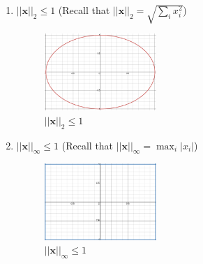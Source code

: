 \documentclass[a4paper]{article}
\theoremstyle{definition}
\newenvironment{soln}{
	\leavevmode\color{blue}\ignorespaces
}{}
\begin{document}
\begin{enumerate}
		\item 	$||\mathbf{x}||_2 \leq 1$ (Recall that $||\mathbf{x}||_2 =\sqrt{\sum_i x_i^2}$)
			\begin{soln}
			\begin{figure}[h!]
			    \centering
			    \includegraphics[width=0.4\textwidth]{images/l2.png}  
			    \captionsetup{labelformat=empty}
			    \caption{$||\mathbf{x}||_2 \leq 1$}
			    \label{fig:l2}
			\end{figure}
		\end{soln}
		\item 	$||\mathbf{x}||_\infty \leq 1$ (Recall that $||\mathbf{x}||_\infty = \max_i |x_i|$)
			\begin{soln}
			\begin{figure}[h!]
			    \centering
			    \includegraphics[width=0.4\textwidth]{images/l3.png}  
			    \captionsetup{labelformat=empty}
			    \caption{$||\mathbf{x}||_\infty \leq 1$}
			    \label{fig:l3}
			\end{figure}
		\end{soln}
	\end{enumerate}
	
\end{document}
